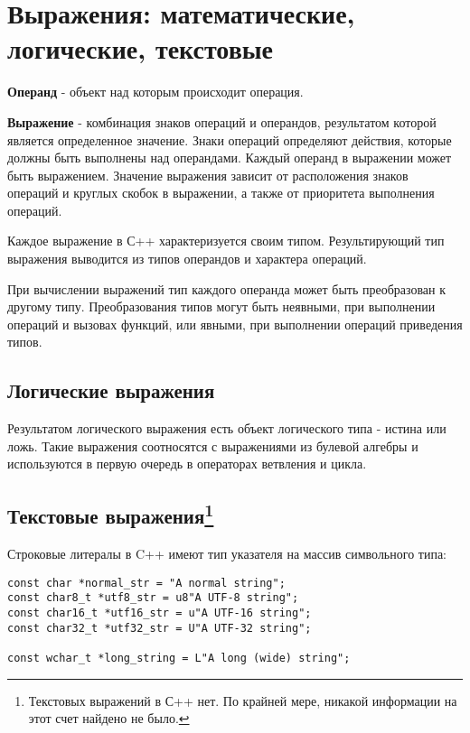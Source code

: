 \section{Выражения: математические, логические,
текстовые}\label{ux432ux44bux440ux430ux436ux435ux43dux438ux44f-ux43cux430ux442ux435ux43cux430ux442ux438ux447ux435ux441ux43aux438ux435-ux43bux43eux433ux438ux447ux435ux441ux43aux438ux435-ux442ux435ux43aux441ux442ux43eux432ux44bux435}

\textbf{Операнд} - объект над которым происходит операция.

\textbf{Выражение} - комбинация знаков операций и операндов, результатом
которой является определенное значение. Знаки операций определяют
действия, которые должны быть выполнены над операндами. Каждый операнд в
выражении может быть выражением. Значение выражения зависит от
расположения знаков операций и круглых скобок в выражении, а также от
приоритета выполнения операций.

Каждое выражение в С++ характеризуется своим типом. Результирующий тип
выражения выводится из типов операндов и характера операций.

При вычислении выражений тип каждого операнда может быть преобразован к
другому типу. Преобразования типов могут быть неявными, при выполнении
операций и вызовах функций, или явными, при выполнении операций
приведения типов.

\subsection{Логические
выражения}\label{ux43bux43eux433ux438ux447ux435ux441ux43aux438ux435-ux432ux44bux440ux430ux436ux435ux43dux438ux44f}

Результатом логического выражения есть объект логического типа - истина
или ложь. Такие выражения соотносятся с выражениями из булевой алгебры и
используются в первую очередь в операторах ветвления и цикла.

\subsection{Текстовые выражения\footnote{Текстовых выражений в С++ нет. По крайней мере, никакой информации на этот счет найдено не было.}}
Строковые литералы в C++ имеют тип указателя на массив символьного типа:
\begin{verbatim}
const char *normal_str = "A normal string";
const char8_t *utf8_str = u8"A UTF-8 string";
const char16_t *utf16_str = u"A UTF-16 string";
const char32_t *utf32_str = U"A UTF-32 string";

const wchar_t *long_string = L"A long (wide) string";
\end{verbatim}

